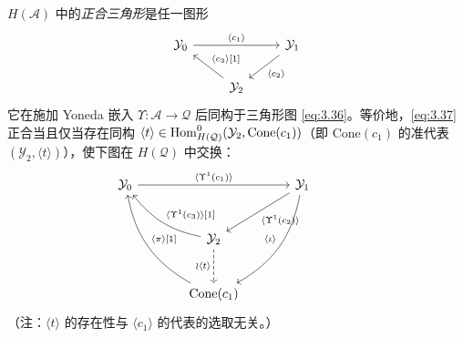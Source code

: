 \begin{Def}\label{def:3.19}
$H(\mathcal A)$ 中的\emph{正合三角形}是任一图形
\begin{equation}\label{eq:3.37}
  \begin{tikzcd}
    \mathcal Y_0 \arrow[rr, "{\langle c_1\rangle}"] & &
      \mathcal Y_1 \arrow[dl, "{\langle c_2\rangle}"] \\
    & \mathcal Y_2 \arrow[ul, "{\langle c_3\rangle{[}1{]}}"'] &
  \end{tikzcd}
\end{equation}
它在施加 Yoneda 嵌入 $\Upsilon:\mathcal A\to\mathcal Q$ 后同构于三角形图
\eqref{eq:3.36}。等价地，\eqref{eq:3.37} 正合当且仅当存在同构
$\langle t\rangle\in\operatorname{Hom}^0_{H(\mathcal Q)}(\mathcal Y_2,
\mathrm{Cone}(c_1))$（即 $\mathrm{Cone}(c_1)$ 的准代表
$(\mathcal Y_2,\langle t\rangle)$），使下图在 $H(\mathcal Q)$ 中交换：
\begin{equation}\label{eq:3.38}
  \begin{tikzcd}[column sep=large, row sep=large]
    \mathcal Y_0 \arrow[rr, "{\langle\Upsilon^1(c_1)\rangle}"] & &
      \mathcal Y_1 \arrow[dl, "{\langle\Upsilon^1(c_2)\rangle}"]
      \arrow[ddl, "{\langle\iota\rangle}"', bend left=25] \\
    & \mathcal Y_2 \arrow[d, dashed, "{\wr\langle t\rangle}"']
      \arrow[ul, "{\langle\Upsilon^1(c_3)\rangle{[}1{]}}"', bend left=20] & & \\
    & \mathrm{Cone}(c_1) \arrow[uul, "{\langle\pi\rangle{[}1{]}}"', bend left=25] & &
  \end{tikzcd}
\end{equation}
（注：$\langle t\rangle$ 的存在性与 $\langle c_1\rangle$ 的代表的选取无关。）
\end{Def}

